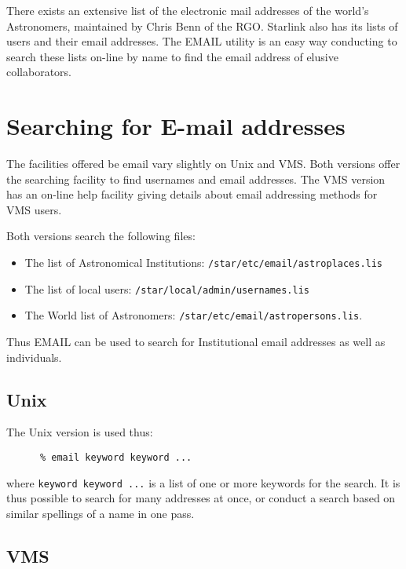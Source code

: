 There exists an extensive list of the electronic mail addresses of the
world's Astronomers, maintained by Chris Benn of the RGO. Starlink also
has its lists of users and their email addresses. The EMAIL utility is
an easy way conducting to search these lists on-line by name to find
the email address of elusive collaborators. 

\section{Searching for E-mail addresses}

The facilities offered be email vary slightly on Unix and VMS. Both
versions offer the searching facility to find usernames and email
addresses.  The VMS version has an on-line help facility giving details
about email addressing methods for VMS users.

Both versions search the following files:

\begin{itemize}

\item The list of Astronomical Institutions:
{\tt /star/etc/email/astroplaces.lis}

\item The list of local users: {\tt /star/local/admin/usernames.lis}

\item The World list of Astronomers: {\tt /star/etc/email/astropersons.lis}.

\end{itemize}

Thus EMAIL can be used to search for Institutional email
addresses as well as individuals.

\subsection{Unix}

The Unix version is used thus:

\begin{verbatim}
      % email keyword keyword ...
\end{verbatim}

where \verb+keyword keyword ...+ is a list of one or more
keywords for the search. It is thus possible to search for many
addresses at once, or conduct a search based on similar spellings of a
name in one pass.

\subsection{VMS}

